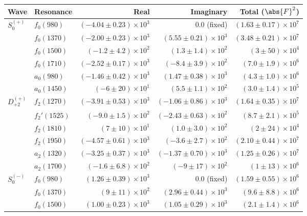 \begin{table}[ht]
    \begin{center}
        \begin{tabular}{llrrr}\toprule
        Wave & Resonance & Real & Imaginary & Total ($\abs{F}^2$) \\\midrule
$S_{0}^{(+)}$ & $f_{0}(980)$ & $(-4.04 \pm 0.23) \times 10^{3}$ & $0.0$ (fixed) & $(1.63 \pm 0.17) \times 10^{7}$ \\
 & $f_{0}(1370)$ & $(-2.00 \pm 0.23) \times 10^{3}$ & $(5.55 \pm 0.21) \times 10^{3}$ & $(3.48 \pm 0.21) \times 10^{7}$ \\
 & $f_{0}(1500)$ & $(-1.2 \pm 4.2) \times 10^{2}$ & $(1.3 \pm 1.4) \times 10^{2}$ & $(3 \pm 50) \times 10^{4}$ \\
 & $f_{0}(1710)$ & $(-2.52 \pm 0.17) \times 10^{3}$ & $(-8.4 \pm 3.9) \times 10^{2}$ & $(7.0 \pm 1.9) \times 10^{6}$ \\
 & $a_{0}(980)$ & $(-1.46 \pm 0.42) \times 10^{3}$ & $(1.47 \pm 0.38) \times 10^{3}$ & $(4.3 \pm 1.0) \times 10^{6}$ \\
 & $a_{0}(1450)$ & $(-6 \pm 20) \times 10^{1}$ & $(5.5 \pm 1.1) \times 10^{2}$ & $(3.0 \pm 1.4) \times 10^{5}$ \\
$D_{+2}^{(+)}$ & $f_{2}(1270)$ & $(-3.91 \pm 0.53) \times 10^{3}$ & $(-1.06 \pm 0.86) \times 10^{3}$ & $(1.64 \pm 0.35) \times 10^{7}$ \\
 & $f_{2}'(1525)$ & $(-9.0 \pm 1.5) \times 10^{2}$ & $(-2.43 \pm 0.63) \times 10^{2}$ & $(8.7 \pm 2.1) \times 10^{5}$ \\
 & $f_{2}(1810)$ & $(7 \pm 10) \times 10^{1}$ & $(1.0 \pm 3.0) \times 10^{2}$ & $(2 \pm 24) \times 10^{4}$ \\
 & $f_{2}(1950)$ & $(-4.57 \pm 0.61) \times 10^{3}$ & $(-3.6 \pm 2.7) \times 10^{2}$ & $(2.10 \pm 0.44) \times 10^{7}$ \\
 & $a_{2}(1320)$ & $(-3.25 \pm 0.37) \times 10^{3}$ & $(-1.37 \pm 0.70) \times 10^{3}$ & $(1.25 \pm 0.26) \times 10^{7}$ \\
 & $a_{2}(1700)$ & $(-1.6 \pm 6.8) \times 10^{2}$ & $(-9 \pm 17) \times 10^{2}$ & $(1 \pm 13) \times 10^{6}$ \\
$S_{0}^{(-)}$ & $f_{0}(980)$ & $(1.26 \pm 0.39) \times 10^{3}$ & $0.0$ (fixed) & $(1.59 \pm 0.55) \times 10^{6}$ \\
 & $f_{0}(1370)$ & $(9 \pm 11) \times 10^{2}$ & $(2.96 \pm 0.44) \times 10^{3}$ & $(9.6 \pm 8.8) \times 10^{6}$ \\
 & $f_{0}(1500)$ & $(1.00 \pm 0.23) \times 10^{3}$ & $(1.05 \pm 0.29) \times 10^{3}$ & $(2.1 \pm 1.4) \times 10^{6}$ \\

\end{tabular}
\end{center}
\end{table}
